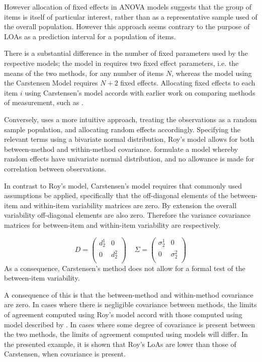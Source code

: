 \documentclass[12pt, a4paper]{report}
\theoremstyle{plain}
\theoremstyle{definition}
\theoremstyle{remark}
\begin{document}
However allocation of fixed effects in ANOVA models suggests that the group of items is itself of particular interest, rather than as a representative sample used of the overall population. However this approach seems contrary to the purpose of LOAs as a prediction interval for a population of items.

There is a substantial difference in the number of fixed parameters used by the respective models; the model in \citet{ARoy2009} requires two fixed effect parameters, i.e. the means of the two methods, for any number of items $N$, whereas the model using the Carstensen Model requires $N+2$ fixed effects. Allocating fixed effects to each item $i$ using Carstensen's model accords with earlier work on comparing methods of measurement, such as \citet{Grubbs48}.

Conversely, \citet{ARoy2009} uses a more intuitive approach, treating the observations as a random sample population, and allocating random effects accordingly. Specifying the relevant terms using a bivariate normal distribution, Roy's model allows for both between-method and within-method covariance. \citet{BXC2008} formulate a model whereby random effects have univariate normal distribution, and no allowance is made for correlation between observations.

In contrast to Roy's model, Carstensen's model requires that commonly used assumptions be applied, specifically that the off-diagonal elements of the between-item and within-item variability matrices are zero. By extension the overall variability off-diagonal elements are also zero. Therefore the variance covariance matrices for
between-item and within-item variability are respectively.

\[{D} = \left(
\begin{array}{cc}
d^1_2  & 0 \\
0 & d^2_2 \\
\end{array}
\right) \;\;\;\; {\Sigma} = \left(
\begin{array}{cc}
\sigma^1_2  & 0 \\
0 & \sigma^2_2 \\
\end{array}
\right) \]
As a consequence, Carstensen's method does not allow for a formal test of the between-item variability.

A consequence of this is that the between-method and within-method covariance are zero. In cases where there is negligible covariance between methods, the limits of agreement computed using Roy's model accord with those computed using model described by \citet{BXC2008}. In cases where some degree of covariance is present between the two methods, the limits of agreement computed using models will differ. In the presented example, it is shown that Roy's LoAs are lower than those of Carstensen, when covariance is present.
\end{document}
